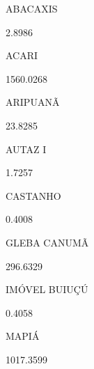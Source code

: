 \documentclass[
  letterpaper,
]{report}
\begin{document}
\n    

\n  

\n  

\n    

\n      

ABACAXIS

\n      

2.8986

\n    

\n    

\n      

ACARI

\n      

1560.0268

\n    

\n    

\n      

ARIPUANÃ

\n      

23.8285

\n    

\n    

\n      

AUTAZ I

\n      

1.7257

\n    

\n    

\n      

CASTANHO

\n      

0.4008

\n    

\n    

\n      

GLEBA CANUMÃ

\n      

296.6329

\n    

\n    

\n      

IMÓVEL BUIUÇÚ

\n      

0.4058

\n    

\n    

\n      

MAPIÁ

\n      

1017.3599

\n    

\n    

\n      
\end{document}
